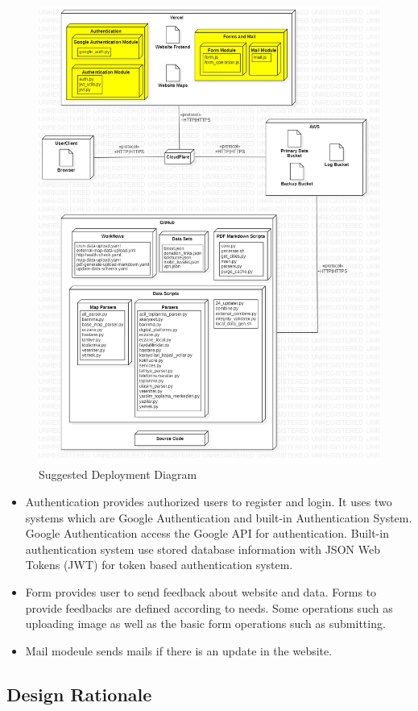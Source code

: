 \begin{figure}[H]
  \centering
  \includegraphics[width=\linewidth]{img/deployment-diagram-s5.jpg}
  \caption{Suggested Deployment Diagram}
\end{figure}

\begin{itemize}
  \item Authentication provides authorized users to register and login. It uses two systems which are Google Authentication and built-in Authentication System.
  \subitem Google Authentication access the Google API for authentication. Built-in authentication system use stored database information with JSON Web Tokens (JWT) for token based authentication system.
  \item Form provides user to send feedback about website and data. Forms to provide feedbacks are defined according to needs. Some operations such as uploading image as well as the basic form operations such as submitting.
  \item Mail modeule sends mails if there is an update in the website.
\end{itemize}

\subsection{Design Rationale}
